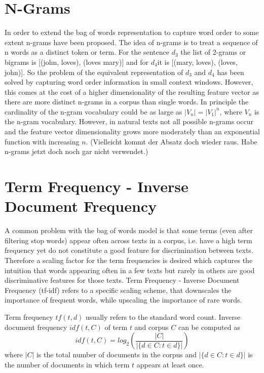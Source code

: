 \documentclass[Thesis.tex]{subfiles}
\begin{document}
\section{N-Grams}

In order to extend the bag of words representation to capture word
order to some extent n-grams have been proposed. The idea of n-grams
is to treat a sequence of n words as a distinct token or term. For
the sentence $d_{3}$ the list of 2-grams or bigrams is {[}(john,
loves), (loves mary){]} and for $d_{4}$it is {[}(mary, loves), (loves,
john){]}. So the problem of the equivalent representation of $d_{3}$
and $d_{4}$ has been solved by capturing word order information in
small context windows. However, this comes at the cost of a higher
dimensionality of the resulting feature vector as there are more distinct
n-grams in a corpus than single words. In principle the cardinality
of the n-gram vocabulary could be as large as $|V_{n}|=|V_{1}|^{n}$,
where $V_{n}$ is the n-gram vocabulary. However, in natural texts
not all possible n-grams occur and the feature vector dimensionality
grows more moderately than an exponential function with increasing
$n$.   (Vielleicht kommt der Absatz doch wieder raus. Habe n-grams jetzt doch noch gar nicht verwendet.)


\section{Term Frequency - Inverse Document Frequency}

A common problem with the bag of words model is that some terms (even
after filtering stop words) appear often across texts in a corpus,
i.e. have a high term frequency yet do not constitute a good feature
for discrimination between texts. Therefore a scaling factor for the
term frequencies is desired which captures the intuition that words
appearing often in a few texts but rarely in others are good discriminative
features for those texts. Term Frequency - Inverse Document Frequency
(tf-idf) refers to a specific scaling scheme, that downscales the
importance of frequent words, while upscaling the importance of rare
words. 

Term frequency $tf(t,d)$ usually refers to the standard word count.
Inverse document frequency $idf(t,C)$ of term $t$ and corpus $C$
can be computed as 
\[
idf(t,C)=log_{2}(\frac{|C|}{|\{d\in C:t\in d\}|})
\]
where $|C|$ is the total number of documents in the corpus and $|\{d\in C:t\in d\}|$
is the number of documents in which term $t$ appears at least once.
\end{document}
